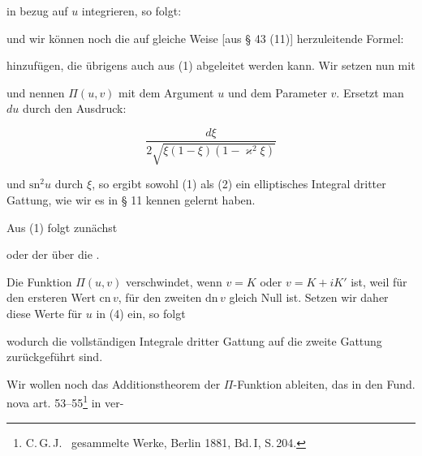 
in bezug auf $u$ integrieren, so folgt:


und wir können noch die auf gleiche Weise [aus § 43 (11)]
herzuleitende Formel:


hinzufügen, die übrigens auch aus (1) abgeleitet werden kann.
Wir setzen nun mit 


und nennen $\Pi(u,v)$  mit dem Argument $u$ und dem Parameter $v$. Ersetzt
man $du$ durch den Ausdruck:

\[
\dfrac{d\xi}{2\sqrt{\xi(1-\xi)(1-\varkappa^2\xi)}}
\]

und $\mathrm{sn}^2u$ durch $\xi$, so ergibt sowohl (1) als (2)
ein elliptisches Integral dritter Gattung, wie wir es in § 11
kennen gelernt haben.

Aus (1) folgt zunächst


oder der  über die .

Die Funktion $\Pi(u,v)$ verschwindet, wenn $v=K$ oder
$v=K+iK'$ ist, weil für den ersteren Wert $\mathrm{cn}\,v$, für
den zweiten $\mathrm{dn}\,v$ gleich Null ist. Setzen wir daher
diese Werte für $u$ in (4) ein, so folgt


wodurch die vollständigen Integrale dritter Gattung auf die
zweite Gattung zurückgeführt sind.

Wir wollen noch das Additionstheorem der $\Pi$-Funktion
ableiten, das  in den Fund. nova art. 53--55\footnote{C.\,G.\,J.\  gesammelte Werke, Berlin 1881, Bd.\,I, S.\,204.} in ver-
